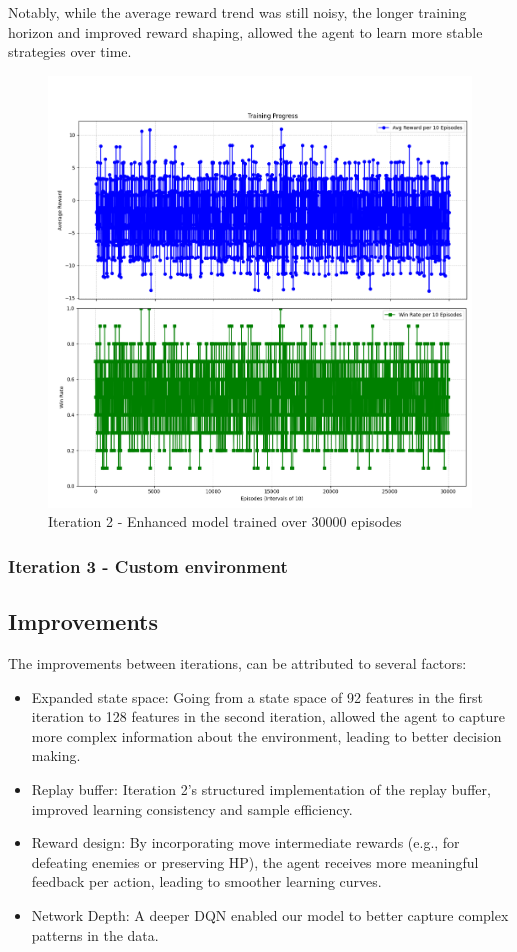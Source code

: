 Notably, while the average reward trend was still noisy, the longer training horizon
and improved reward shaping, allowed the agent to learn more stable strategies over time.

\begin{figure}[H]
    \centering
    \includegraphics[width=\textwidth]{assets/Iteration-2-graphs.png}
    \caption{Iteration 2 - Enhanced model trained over 30000 episodes}
    \label{fig:iteration-2-graphs}
\end{figure}

\subsubsection{Iteration 3 - Custom environment}

\subsection{Improvements}
The improvements between iterations, can be attributed to several factors:
\begin{itemize}
    \item Expanded state space: Going from a state space of 92 features in the first iteration
          to 128 features in the second iteration, allowed the agent to capture more complex information
          about the environment, leading to better decision making.
    \item Replay buffer: Iteration 2's structured implementation of the replay buffer, improved
          learning consistency and sample efficiency.
    \item Reward design: By incorporating move intermediate rewards (e.g., for defeating enemies or preserving HP),
          the agent receives more meaningful feedback per action, leading to smoother learning curves.
    \item Network Depth: A deeper DQN enabled our model to better capture complex patterns in the data.
\end{itemize}